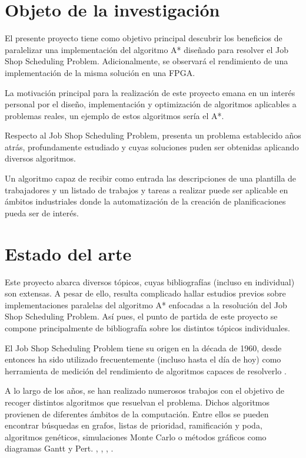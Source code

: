 
\section{Objeto de la investigación}

El presente proyecto tiene como objetivo principal descubrir los
beneficios de paralelizar una implementación del algoritmo A*
diseñado para resolver el Job Shop Scheduling Problem.
Adicionalmente, se observará el rendimiento de una implementación
de la misma solución en una FPGA.

La motivación principal para la realización de este proyecto
emana en un interés personal por el diseño, implementación y optimización
de algoritmos aplicables a problemas reales,
un ejemplo de estos algoritmos sería el A*.

Respecto al Job Shop Scheduling Problem, presenta un problema establecido
años atrás, profundamente estudiado y cuyas soluciones
puden ser obtenidas aplicando diversos algoritmos.

Un algoritmo capaz de recibir como entrada las descripciones de una plantilla
de trabajadores y un listado de trabajos y tareas a realizar puede ser
aplicable en ámbitos industriales donde la automatización de la creación
de planificaciones pueda ser de interés.

\section{Estado del arte}

Este proyecto abarca diversos tópicos, cuyas bibliografías
(incluso en individual) son extensas.
A pesar de ello, resulta complicado hallar estudios previos sobre implementaciones
paralelas del algoritmo A* enfocadas a la resolución del Job Shop Scheduling Problem.
Así pues, el punto de partida de este proyecto
se compone principalmente de bibliografía
sobre los distintos tópicos individuales.

El Job Shop Scheduling Problem tiene su origen en la década de 1960,
desde entonces ha sido utilizado frecuentemente (incluso hasta el día de hoy)
como herramienta de medición del rendimiento de algoritmos
capaces de resolverlo \cite{Man67}.

A lo largo de los años, se han realizado numerosos trabajos con el objetivo
de recoger distintos algoritmos que resuelvan el problema.
Dichos algoritmos provienen de diferentes ámbitos de la computación.
Entre ellos se pueden encontrar búsquedas en grafos,
listas de prioridad, ramificación y poda, algoritmos genéticos,
simulaciones Monte Carlo o
métodos gráficos como diagramas Gantt y Pert.
\cite{Yan77}, \cite{Nil69}, \cite{KTM99}, \cite{BC22}.

